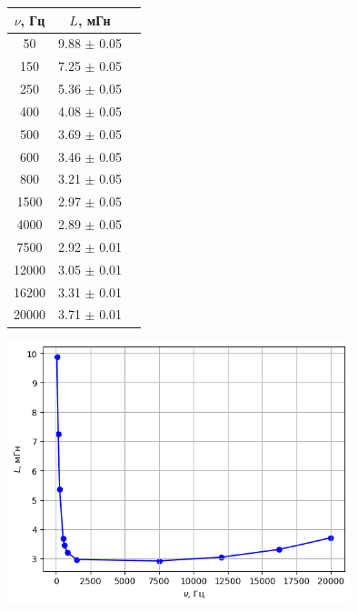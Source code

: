 \begin{figure}[h!]
    \begin{minipage}{0.5\linewidth}
        \centering
        \begin{tabular}{|c|c|c|}
            \hline
        $\nu$, Гц & $L$, мГн\\\hline
        50   & 9.88  $\pm$ 0.05\\\hline
        150  & 7.25  $\pm$ 0.05\\\hline
        250  & 5.36  $\pm$ 0.05\\\hline
        400  & 4.08  $\pm$ 0.05\\\hline
        500  & 3.69  $\pm$ 0.05\\\hline
        600  & 3.46  $\pm$ 0.05\\\hline
        800  & 3.21  $\pm$ 0.05\\\hline
        1500 & 2.97  $\pm$ 0.05\\\hline
        4000 & 2.89  $\pm$ 0.05\\\hline
        7500 & 2.92  $\pm$ 0.01\\\hline
        12000& 3.05  $\pm$ 0.01\\\hline
        16200& 3.31  $\pm$ 0.01\\\hline
        20000& 3.71  $\pm$ 0.01\\\hline
        \end{tabular}
    \end{minipage}
    \begin{minipage}{0.5\linewidth}
        \centering
        \includegraphics[width=10cm]{images/plot4.png}
    \end{minipage}
\end{figure}


